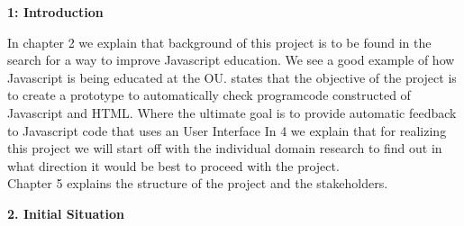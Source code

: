 \documentclass{article}
\begin{document}
\textbf{1: Introduction}
\newline

\noindent
\newline
In chapter 2 we explain that background of this project is to be found in the search for a way to improve Javascript education. We see a good example of how Javascript is being educated at the OU.
 states that the objective of the project is to create a prototype to automatically check programcode constructed of Javascript and HTML.
Where the ultimate goal is to provide automatic feedback to Javascript code that uses an User Interface
\newline
In 4 we explain that for realizing this project we will start off with the individual domain research to find out in what direction it would be best to proceed with the project.\\
Chapter 5 explains the structure of the project and the stakeholders.
\newline

\textbf{2. Initial Situation}
\end{document}
